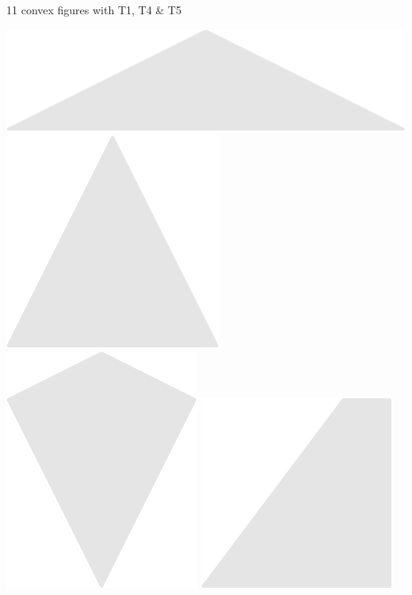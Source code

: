 \documentclass[14pt]{beamer}
\begin{document}
\begin{frame}{11 convex figures with T1, T4 \& T5}
\begin{center}
            \bigskip\medskip

            \includegraphics[scale=0.39]{figures/figure004d.pdf}\quad
            \includegraphics[scale=0.39]{figures/figure004c.pdf}
            \includegraphics[scale=0.39]{figures/figure004j.pdf}\!\!
            \includegraphics[scale=0.39]{figures/figure004g.pdf}\quad

\end{center}
\end{frame}
\end{document}
